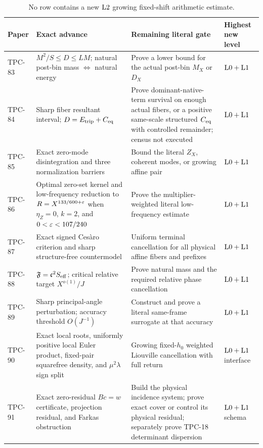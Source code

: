 \begin{table}[H]
\centering
\footnotesize
\begin{tabularx}{\textwidth}{@{}
  >{\raggedright\arraybackslash}p{}
  >{\raggedright\arraybackslash}p{}
  >{\raggedright\arraybackslash}X
  >{\raggedright\arraybackslash}p{}@{}}
\toprule
Paper & Exact advance & Remaining literal gate & Highest new level\\
\midrule
TPC-83
&
\(M^2/S\le D\le LM\); natural post-bin mass
\(\Longleftrightarrow\) natural energy
&
Prove a lower bound for the actual post-bin \(M_X\) or \(D_X\)
&
\(\mathrm{L0}+\mathrm{L1}\)
\\
\addlinespace
TPC-84
&
Sharp fiber resultant interval;
\(D=E_{\rm trip}+C_{\rm eq}\)
&
Prove dominant-native-term survival on enough actual fibers, or a
positive same-scale structured \(C_{\rm eq}\) with controlled
remainder; census not executed
&
\(\mathrm{L0}+\mathrm{L1}\)
\\
\addlinespace
TPC-85
&
Exact zero-mode disintegration and three normalization barriers
&
Bound the literal \(Z_X\), coherent modes, or growing affine pair
&
\(\mathrm{L0}+\mathrm{L1}\)
\\
\addlinespace
TPC-86
&
Optimal zero-set kernel and low-frequency reduction to
\(R=X^{133/600+\varepsilon}\) when \(\eta_Z=0\), \(k=2\), and
\(0<\varepsilon<107/240\)
&
Prove the multiplier-weighted literal low-frequency estimate
&
\(\mathrm{L0}+\mathrm{L1}\)
\\
\addlinespace
TPC-87
&
Exact signed Ces\`aro criterion and sharp structure-free countermodel
&
Uniform terminal cancellation for all physical affine fibers and
prefixes
&
\(\mathrm{L0}+\mathrm{L1}\)
\\
\addlinespace
TPC-88
&
\(\mathfrak F=\mathfrak c^2S_{\mathrm{eff}}\); critical relative target \(X^{o(1)}/J\)
&
Prove natural mass and the required relative phase cancellation
&
\(\mathrm{L0}+\mathrm{L1}\)
\\
\addlinespace
TPC-89
&
Sharp principal-angle perturbation; accuracy threshold \(O(J^{-1})\)
&
Construct and prove a literal same-frame surrogate at that accuracy
&
\(\mathrm{L0}+\mathrm{L1}\)
\\
\addlinespace
TPC-90
&
Exact local roots, uniformly positive local Euler product,
fixed-pair squarefree density, and \(\mu^2\lambda\) sign split
&
Growing fixed-\(h_0\) weighted Liouville cancellation with full return
&
\(\mathrm{L0}+\mathrm{L1}\) interface
\\
\addlinespace
TPC-91
&
Exact zero-residual \(Bc=w\) certificate, projection residual, and
Farkas obstruction
&
Build the physical incidence system; prove exact cover or control its
physical residual; separately prove TPC-18 determinant dispersion
&
\(\mathrm{L0}+\mathrm{L1}\) schema
\\
\bottomrule
\end{tabularx}
\caption{No row contains a new \(\mathrm{L2}\) growing fixed-shift
arithmetic estimate.}
\label{tab:paper-scorecard}
\end{table}
